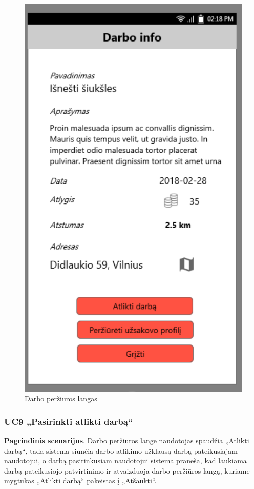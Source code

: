 \documentclass{VUMIFPSbakalaurinis}
\begin{document}
\begin{figure}[H]
	\centering
	\includegraphics[scale=0.4]{img/ScreenShots/6}
	\caption{Darbo peržiūros langas}
	\label{img:selected job 1}
\end{figure}
\subsubsection{UC9 „Pasirinkti atlikti darbą“}
\textbf{Pagrindinis scenarijus}. Darbo peržiūros lange naudotojas spaudžia „Atlikti darbą“, tada sistema siunčia darbo atlikimo užklausą darbą pateikusiajam naudotojui, o darbą pasirinkusiam naudotojui sistema praneša, kad laukiama darbą pateikusiojo patvirtinimo ir atvaizduoja darbo peržiūros langą, kuriame mygtukas „Atlikti darbą“ pakeistas į „Atšaukti“.
\end{document}
